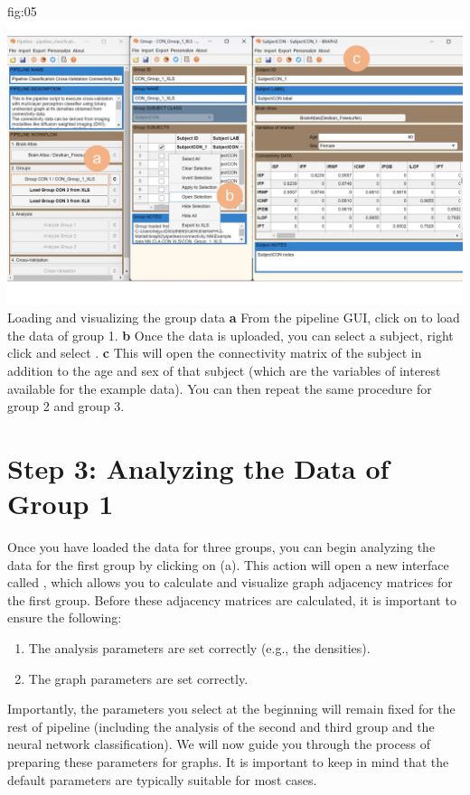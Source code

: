 \documentclass[justified]{tufte-handout}
\begin{document}
{%

	{fig:05}
	{
	\includegraphics{fig05.jpg}
	}
	{Loading and visualizing the group data}
	{
	{\bf a} From the pipeline GUI, click on  to load the data of group 1.
	{\bf b} Once the data is uploaded, you can select a subject, right click and select .
	{\bf c} This will open the connectivity matrix of the subject in addition to the age and sex of that subject (which are the variables of interest available for the example data).
	You can then repeat the same procedure for group 2 and group 3.
	}

\clearpage
\section{Step 3: Analyzing the Data of Group 1}

Once you have loaded the data for three groups, you can begin analyzing the data for the first group by clicking on  (a). 
This action will open a new interface called , which allows you to calculate and visualize graph adjacency matrices for the first group. 
Before these adjacency matrices are calculated, it is important to ensure the following: 
\begin{enumerate}
	\item The analysis parameters are set correctly (e.g., the densities).
	\item The graph parameters are set correctly.
\end{enumerate}

Importantly, the parameters you select at the beginning will remain fixed for the rest of pipeline (including the analysis of the second and third group and the neural network classification). We will now guide you through the process of preparing these parameters for graphs. It is important to keep in mind that the default parameters are typically suitable for most cases.

}
\end{document}

